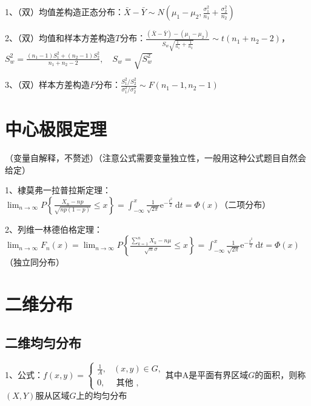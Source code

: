 1、（双）均值差构造正态分布：$\bar{X}-\bar{Y} \sim N\left(\mu_{1}-\mu_{2}, \frac{\sigma_{1}^{2}}{n_{1}}+\frac{\sigma_{2}^{2}}{n_{2}}\right)$

2、（双）均值和样本方差构造$T$分布：$\frac{(\bar{X}-\bar{Y})-\left(\mu_{1}-\mu_{2}\right)}{S_{w} \sqrt{\frac{1}{n_{1}}+\frac{1}{n_{2}}}} \sim t\left(n_{1}+n_{2}-2\right)$，$S_{w}^{2}=\frac{\left(n_{1}-1\right) S_{1}^{2}+\left(n_{2}-1\right) S_{2}^{2}}{n_{1}+n_{2}-2}, \quad S_{w}=\sqrt{S_{w}^{2}}$

3、（双）样本方差构造$F$分布：$\frac{S_{1}^{2} / S_{2}^{2}}{\sigma_{1}^{2} / \sigma_{2}^{2}} \sim F\left(n_{1}-1, n_{2}-1\right)$

\section{中心极限定理}

（变量自解释，不赘述）（注意公式需要变量独立性，一般用这种公式题目自然会给定）

1、棣莫弗一拉普拉斯定理：$\lim _{n \rightarrow \infty} P\left\{\frac{X_{n}-n p}{\sqrt{n p(1-p)}} \leqslant x\right\}=\int_{-\infty}^{x} \frac{1}{\sqrt{2 \pi}} \mathrm{e}^{-\frac{t^{2}}{2}} \mathrm{~d} t=\Phi(x)$（二项分布）

2、列维一林德伯格定理：$\lim_{n \rightarrow \infty} F_{n}(x)=\lim_{n \rightarrow \infty} P\left\{\frac{\sum_{k=1}^{n} X_{k}-n \mu}{\sqrt{n} \sigma} \leqslant x\right\}=\int_{-\infty}^{x} \frac{1}{\sqrt{2 \pi}} \mathrm{e}^{-\frac{t^{2}}{2}} \mathrm{~d} t=\Phi(x)$（独立同分布）

\section{二维分布}



\subsection{二维均匀分布}

1、公式：$f(x, y)=\left\{\begin{array}{lc}

\frac{1}{A}, & (x, y) \in G, \\

0, & \text { 其他 },

\end{array}\right.$其中A是平面有界区域$G$的面积，则称$(X,Y)$服从区域$G$上的均匀分布




